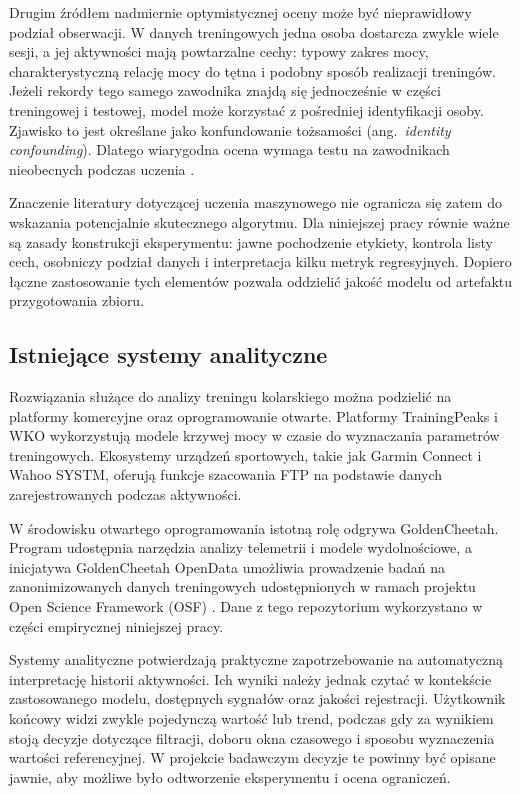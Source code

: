 Drugim źródłem nadmiernie optymistycznej oceny może być nieprawidłowy podział obserwacji. W danych treningowych jedna osoba dostarcza zwykle wiele sesji, a jej aktywności mają powtarzalne cechy: typowy zakres mocy, charakterystyczną relację mocy do tętna i podobny sposób realizacji treningów. Jeżeli rekordy tego samego zawodnika znajdą się jednocześnie w części treningowej i testowej, model może korzystać z pośredniej identyfikacji osoby. Zjawisko to jest określane jako konfundowanie tożsamości (ang.\ \textit{identity confounding}). Dlatego wiarygodna ocena wymaga testu na zawodnikach nieobecnych podczas uczenia \parencite{saeb2017useCase,chaibubNeto2019identity,tougui2021crossValidation,rosenblatt2024leakage}.

Znaczenie literatury dotyczącej uczenia maszynowego nie ogranicza się zatem do wskazania potencjalnie skutecznego algorytmu. Dla niniejszej pracy równie ważne są zasady konstrukcji eksperymentu: jawne pochodzenie etykiety, kontrola listy cech, osobniczy podział danych i interpretacja kilku metryk regresyjnych. Dopiero łączne zastosowanie tych elementów pozwala oddzielić jakość modelu od artefaktu przygotowania zbioru.

\subsection{Istniejące systemy analityczne}

Rozwiązania służące do analizy treningu kolarskiego można podzielić na platformy komercyjne oraz oprogramowanie otwarte. Platformy TrainingPeaks i WKO wykorzystują modele krzywej mocy w czasie do wyznaczania parametrów treningowych. Ekosystemy urządzeń sportowych, takie jak Garmin Connect i Wahoo SYSTM, oferują funkcje szacowania FTP na podstawie danych zarejestrowanych podczas aktywności.

W środowisku otwartego oprogramowania istotną rolę odgrywa GoldenCheetah. Program udostępnia narzędzia analizy telemetrii i modele wydolnościowe, a inicjatywa GoldenCheetah OpenData umożliwia prowadzenie badań na zanonimizowanych danych treningowych udostępnionych w ramach projektu Open Science Framework (OSF) \parencite{osf_goldencheetah_opendata}. Dane z tego repozytorium wykorzystano w części empirycznej niniejszej pracy.

Systemy analityczne potwierdzają praktyczne zapotrzebowanie na automatyczną interpretację historii aktywności. Ich wyniki należy jednak czytać w kontekście zastosowanego modelu, dostępnych sygnałów oraz jakości rejestracji. Użytkownik końcowy widzi zwykle pojedynczą wartość lub trend, podczas gdy za wynikiem stoją decyzje dotyczące filtracji, doboru okna czasowego i sposobu wyznaczenia wartości referencyjnej. W projekcie badawczym decyzje te powinny być opisane jawnie, aby możliwe było odtworzenie eksperymentu i ocena ograniczeń.

